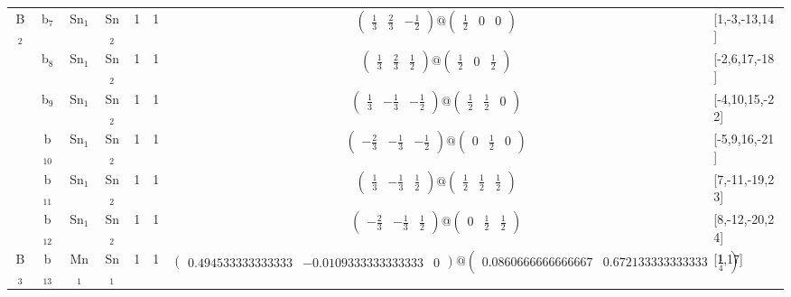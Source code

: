 \documentclass[fleqn,10pt,landscape]{article}
\begin{document}
\begin{itemize}
\begin{center}
\begin{longtable}{cc|cc|c|c|c|l}
B$_{2}$ & b$_{7}$ & Sn$_{1}$ & Sn$_{2}$ & 1 & 1 & $\begin{pmatrix} \frac{1}{3} & \frac{2}{3} & - \frac{1}{2} \end{pmatrix}@\begin{pmatrix} \frac{1}{2} & 0 & 0 \end{pmatrix}$ & [1,-3,-13,14] \\
& b$_{8}$ & Sn$_{1}$ & Sn$_{2}$ & 1 & 1 & $\begin{pmatrix} \frac{1}{3} & \frac{2}{3} & \frac{1}{2} \end{pmatrix}@\begin{pmatrix} \frac{1}{2} & 0 & \frac{1}{2} \end{pmatrix}$ & [-2,6,17,-18] \\
& b$_{9}$ & Sn$_{1}$ & Sn$_{2}$ & 1 & 1 & $\begin{pmatrix} \frac{1}{3} & - \frac{1}{3} & - \frac{1}{2} \end{pmatrix}@\begin{pmatrix} \frac{1}{2} & \frac{1}{2} & 0 \end{pmatrix}$ & [-4,10,15,-22] \\
& b$_{10}$ & Sn$_{1}$ & Sn$_{2}$ & 1 & 1 & $\begin{pmatrix} - \frac{2}{3} & - \frac{1}{3} & - \frac{1}{2} \end{pmatrix}@\begin{pmatrix} 0 & \frac{1}{2} & 0 \end{pmatrix}$ & [-5,9,16,-21] \\
& b$_{11}$ & Sn$_{1}$ & Sn$_{2}$ & 1 & 1 & $\begin{pmatrix} \frac{1}{3} & - \frac{1}{3} & \frac{1}{2} \end{pmatrix}@\begin{pmatrix} \frac{1}{2} & \frac{1}{2} & \frac{1}{2} \end{pmatrix}$ & [7,-11,-19,23] \\
& b$_{12}$ & Sn$_{1}$ & Sn$_{2}$ & 1 & 1 & $\begin{pmatrix} - \frac{2}{3} & - \frac{1}{3} & \frac{1}{2} \end{pmatrix}@\begin{pmatrix} 0 & \frac{1}{2} & \frac{1}{2} \end{pmatrix}$ & [8,-12,-20,24] \\ \hline
B$_{3}$ & b$_{13}$ & Mn$_{1}$ & Sn$_{1}$ & 1 & 1 & $\begin{pmatrix} 0.494533333333333 & -0.0109333333333333 & 0 \end{pmatrix}@\begin{pmatrix} 0.0860666666666667 & 0.672133333333333 & \frac{1}{4} \end{pmatrix}$ & [1,17] \\

\end{longtable}
\end{center}
\end{itemize}
\end{document}
